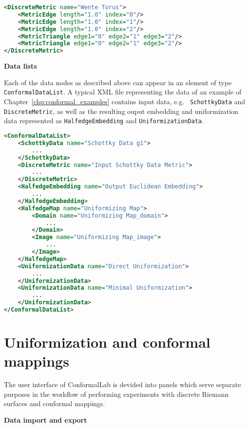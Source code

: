 \documentclass[Thesis.tex]{subfiles}
\begin{document}
\begin{lstlisting}[label=lst:discretemetric_xml, caption={A wente torus given by a discrete metric. Vertices are given implictly
by following the order of triangle glueings.}, numbers=none, language=XML, captionpos=b]
<DiscreteMetric name="Wente Torus">
	<MetricEdge length="1.0" index="0"/>
	<MetricEdge length="1.0" index="1"/>
	<MetricEdge length="1.0" index="2"/>
	<MetricTriangle edge1="0" edge2="1" edge3="2"/>
	<MetricTriangle edge1="0" edge2="1" edge3="2"/>
</DiscreteMetric>
\end{lstlisting}

{\bf Data lists}

Each of the data nodes as described above can appear in an element of type {\tt
ConformalDataList}. A typical XML file representing the data of an example of
Chapter~\ref{chp:conformal_examples} contains input data, e.g. {\tt
SchottkyData} and {\tt DiscreteMetric}, as well as the resulting ouput
embedding and uniformization data represented as {\tt HalfedgeEmbedding} and
{\tt UniformizationData}.

\begin{lstlisting}[label=lst:datalist_xml, caption={A list of data XML nodes as the result of an algorithm calculating the Fuchsian uniformization of a genus $1$ Riemann surface given by Schottky data.}, numbers=none, language=XML, captionpos=b]
<ConformalDataList>
	<SchottkyData name="Schottky Data g1">
		...
	</SchottkyData>
	<DiscreteMetric name="Input Schottky Data Metric">
		...
	</DiscreteMetric>
	<HalfedgeEmbedding name="Output Euclidean Embedding">
		...
	</HalfedgeEmbedding>
	<HalfedgeMap name="Uniformizing Map">
		<Domain name="Uniformizing Map_domain">
			...
		</Domain>
		<Image name="Uniformizing Map_image">
			...
		</Image>
	</HalfedgeMap>
	<UniformizationData name="Direct Uniformization">
		...
	</UniformizationData>
	<UniformizationData name="Minimal Uniformization">
		...
	</UniformizationData>
</ConformalDataList>
\end{lstlisting}

\section{Uniformization and conformal mappings} \label{sec:conformallab_ui} The
user interface of {\sc ConformalLab} is devided into panels which serve
separate purposes in the workflow of performing experiments with discrete
Riemann surfaces and conformal mappings.


{\bf Data import and export}
\end{document}
